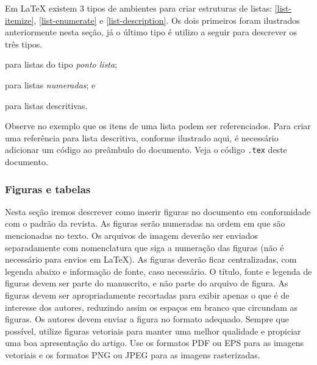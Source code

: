\documentclass{textolivre}
\begin{document}
Em \LaTeX{} existem 3 tipos de ambientes para criar estruturas de listas: \ref{list-itemize}, \ref{list-enumerate} e \ref{list-description}.
Os dois primeiros foram ilustrados anteriormente nesta seção, já o último tipo é
utilizo a seguir para descrever os três tipos.
\begin{description}[topsep=1ex,partopsep=1ex]
  \item[itemize\label{list-itemize}] para listas do tipo \emph{ponto lista};
  \item[enumerate\label{list-enumerate}] para listas \emph{numeradas}; e
  \item[description\label{list-description}] para listas descritivas.
\end{description}
Observe no exemplo que os itens de uma lista podem ser referenciados. Para criar uma referência para lista descritiva,
conforme ilustrado aqui, é necessário adicionar um código ao preâmbulo do documento. Veja o código \texttt{.tex} deste documento.


\subsubsection{Figuras e tabelas}\label{sec-figuras-tabelas}
Nesta seção iremos descrever como inserir figuras no documento em conformidade com o padrão da revista. 
As figuras serão numeradas na ordem em que são mencionadas no texto. Os arquivos de imagem deverão
ser enviados separadamente com nomenclatura que siga a numeração das figuras (não é necessário para envios em \LaTeX{}).
As figuras deverão ficar centralizadas, com legenda abaixo e informação de fonte, caso necessário.
O título, fonte e legenda de figuras devem ser parte do manuscrito, e não parte do arquivo de figura.
As figuras devem ser apropriadamente recortadas para exibir apenas o que é de interesse dos autores,
reduzindo assim os espaços em branco que circundam as figuras.
Os autores devem enviar a figura no formato adequado. 
Sempre que possível, utilize figuras vetoriais para manter uma melhor qualidade e propiciar uma boa apresentação do artigo. 
Use os formatos PDF ou EPS para as imagens vetoriais e os formatos PNG ou JPEG para as imagens rasterizadas. 
\end{document}
